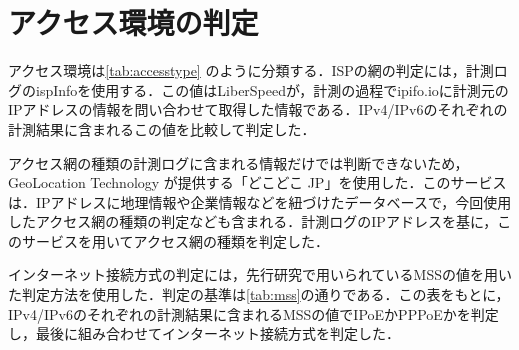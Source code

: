 \section{アクセス環境の判定}
\label{label:accesstype}
アクセス環境は\cref{tab:accesstype} のように分類する．ISPの網の判定には，計測ログのispInfoを使用する．この値はLiberSpeedが，計測の過程でipifo.io\cite{ipinfo}に計測元のIPアドレスの情報を問い合わせて取得した情報である．IPv4/IPv6のそれぞれの計測結果に含まれるこの値を比較して判定した．

アクセス網の種類の計測ログに含まれる情報だけでは判断できないため，GeoLocation Technology が提供する「どこどこ JP」\cite{docodoco}を使用した．このサービスは．IPアドレスに地理情報や企業情報などを紐づけたデータベースで，今回使用したアクセス網の種類の判定なども含まれる．計測ログのIPアドレスを基に，このサービスを用いてアクセス網の種類を判定した．


インターネット接続方式の判定には，先行研究で用いられているMSSの値を用いた判定方法を使用した．判定の基準は\cref{tab:mss}の通りである．この表をもとに，IPv4/IPv6のそれぞれの計測結果に含まれるMSSの値でIPoEかPPPoEかを判定し，最後に組み合わせてインターネット接続方式を判定した．


